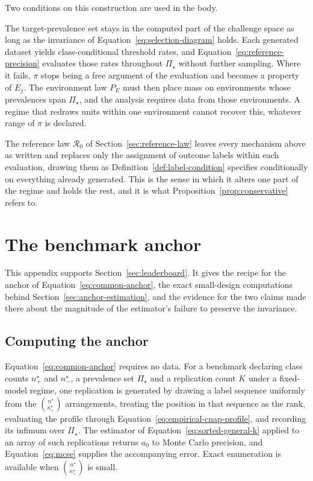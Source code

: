 \documentclass[11pt]{article}
\newcommand{\Regime}{\mathcal{R}}
\newcommand{\PSet}{\Pi_\star}
\theoremstyle{remark}
\begin{document}
Two conditions on this construction are used in the body.

The target-prevalence set stays in the computed part of the challenge space as long as the invariance of Equation~\eqref{eq:selection-diagram} holds. Each generated dataset yields class-conditional threshold rates, and Equation~\eqref{eq:reference-precision} evaluates those rates throughout $\PSet$ without further sampling. Where it fails, $\pi$ stops being a free argument of the evaluation and becomes a property of $E_j$. The environment law $P_E$ must then place mass on environments whose prevalences span $\PSet$, and the analysis requires data from those environments. A regime that redraws units within one environment cannot recover this, whatever range of $\pi$ is declared.

The reference law $\Regime_0$ of Section~\ref{sec:reference-law} leaves every mechanism above as written and replaces only the assignment of outcome labels within each evaluation, drawing them as Definition~\ref{def:label-condition} specifies conditionally on everything already generated. This is the sense in which it alters one part of the regime and holds the rest, and it is what Proposition~\ref{prop:conservative} refers to.

\section{The benchmark anchor}
\label{app:anchor}

This appendix supports Section~\ref{sec:leaderboard}. It gives the recipe for the anchor of Equation~\eqref{eq:common-anchor}, the exact small-design computations behind Section~\ref{sec:anchor-estimation}, and the evidence for the two claims made there about the magnitude of the estimator's failure to preserve the invariance.

\subsection{Computing the anchor}

Equation~\eqref{eq:common-anchor} requires no data. For a benchmark declaring class counts $n^\star_+$ and $n^\star_-$, a prevalence set $\PSet$ and a replication count $K$ under a fixed-model regime, one replication is generated by drawing a label sequence uniformly from the $\binom{n^\star}{n^\star_+}$ arrangements, treating the position in that sequence as the rank, evaluating the profile through Equation~\eqref{eq:empirical-cnap-profile}, and recording its infimum over $\PSet$. The estimator of Equation~\eqref{eq:sorted-general-k} applied to an array of such replications returns $a_0$ to Monte Carlo precision, and Equation~\eqref{eq:mcse} supplies the accompanying error. Exact enumeration is available when $\binom{n^\star}{n^\star_+}$ is small.
\end{document}
